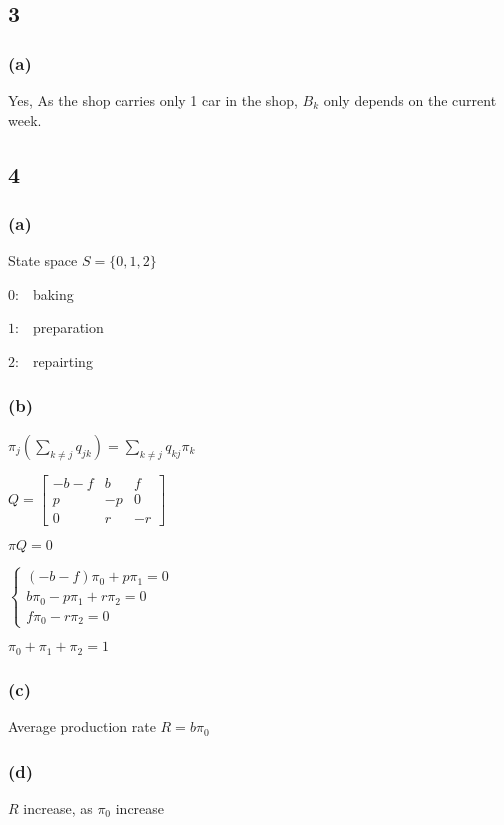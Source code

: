 \documentclass{article}
\begin{document}
\subsection*{3}
\subsubsection*{(a)}
Yes, As the shop carries only 1 car in the shop, $B_{k}$ only depends on the current week. 


\subsection*{4}
\subsubsection*{(a)}
State space $S=\{0,1,2\}$\par
$0:$ \ baking\par
$1:$ \ preparation\par
$2:$ \ repairting\par
\subsubsection*{(b)}
$\pi_{j}(\sum _{k\neq j}q_{jk})=\sum _{k\neq j}q_{kj}\pi_{k}$\par\indent
\par
$Q=\begin{bmatrix}
-b-f & b & f \\
p & -p & 0 \\
0 & r & -r
\end{bmatrix}$\par\indent
\par
$\pi Q=0$\par\indent
\par
$\begin{cases}(-b-f)\pi_{0}+p\pi_{1}=0\\
b\pi_{0}-p\pi_{1}+r\pi_{2}=0\\
f\pi_{0}-r\pi_{2}=0\end{cases}$\par\indent
\par
$\pi_{0}+\pi_{1}+\pi_{2}=1$
\subsubsection*{(c)}
Average production rate $R=b\pi_{0}$
\subsubsection*{(d)}
$R$ increase, as $\pi_{0}$ increase
\end{document}
